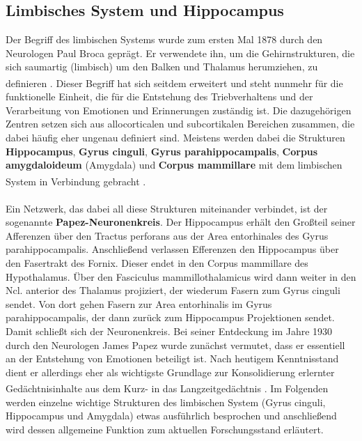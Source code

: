 \subsection{Limbisches System und Hippocampus} \label{subsec:limisches_system} 
Der Begriff des limbischen Systems wurde zum ersten Mal 1878 durch den Neurologen Paul Broca geprägt. Er verwendete ihn, um die Gehirnstrukturen, die sich saumartig (limbisch) um den Balken und Thalamus herumziehen, zu definieren \textsuperscript{\cite[Kap.~18]{neurowissenschaften_baer}}. Dieser Begriff hat sich seitdem erweitert und steht nunmehr für die funktionelle Einheit, die für die Entstehung des Triebverhaltens und der Verarbeitung von Emotionen und Erinnerungen zuständig ist. Die dazugehörigen Zentren setzen sich aus allocorticalen und subcortikalen Bereichen zusammen, die dabei häufig eher ungenau definiert sind. Meistens werden dabei die Strukturen \textbf{Hippocampus}, \textbf{Gyrus cinguli}, \textbf{Gyrus parahippocampalis}, \textbf{Corpus amygdaloideum} (Amygdala) und \textbf{Corpus mammillare}   mit dem limbischen System in Verbindung gebracht \textsuperscript{\cite[Kap.~9]{trepel2011neuroanatomie}}.\\ 
\\ \noindent Ein Netzwerk, das dabei all diese Strukturen miteinander verbindet, ist der sogenannte \textbf{Papez-Neuronenkreis}. Der Hippocampus erhält den Großteil seiner Afferenzen über den Tractus perforans aus der Area entorhinales des Gyrus parahippocampalis. Anschließend verlassen Efferenzen den Hippocampus über den Fasertrakt des Fornix. Dieser endet in den Corpus mammillare des Hypothalamus. Über den Fasciculus mammillothalamicus wird dann weiter in den Ncl. anterior des Thalamus projiziert, der wiederum Fasern zum Gyrus cinguli sendet. Von dort gehen Fasern zur Area entorhinalis im Gyrus parahippocampalis, der dann zurück zum Hippocampus Projektionen sendet. Damit schließt sich der Neuronenkreis. Bei seiner Entdeckung im Jahre 1930 durch den Neurologen James Papez wurde zunächst vermutet, dass er essentiell an der Entstehung von Emotionen beteiligt ist. Nach heutigem Kenntnisstand dient er allerdings eher als wichtigste Grundlage zur Konsolidierung erlernter Gedächtnisinhalte aus dem Kurz- in das Langzeitgedächtnis \textsuperscript{\cite[Kap.~9]{trepel2011neuroanatomie}}. Im Folgenden werden einzelne wichtige Strukturen des limbischen System (Gyrus cinguli, Hippocampus und Amygdala) etwas ausführlich besprochen und anschließend wird dessen allgemeine Funktion zum aktuellen Forschungsstand erläutert.

